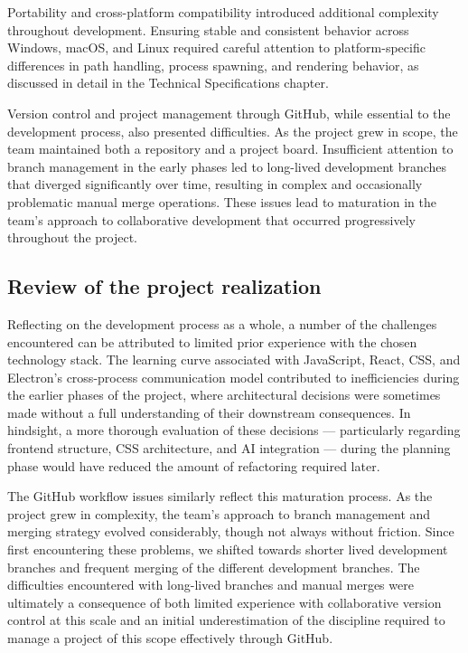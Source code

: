 \documentclass[a4paper,12pt]{article}
\begin{document}
Portability and cross-platform compatibility introduced additional complexity throughout development. 
Ensuring stable and consistent behavior across Windows, macOS, and Linux required careful attention to platform-specific differences in path handling, process spawning, and rendering behavior, as discussed in detail in the Technical Specifications chapter.

Version control and project management through GitHub, while essential to the development process, also presented difficulties. 
As the project grew in scope, the team maintained both a repository and a project board. 
Insufficient attention to branch management in the early phases led to long-lived development branches that diverged significantly over time, resulting in complex and occasionally problematic manual merge operations. 
These issues lead to maturation in the team's approach to collaborative development that occurred progressively throughout the project.

\newpage
\subsection{Review of the project realization}
Reflecting on the development process as a whole, a number of the challenges encountered can be attributed to limited prior experience with the chosen technology stack. The learning curve associated with JavaScript, React, CSS, and Electron's cross-process communication model contributed to inefficiencies during the earlier phases of the project, where architectural decisions were sometimes made without a full understanding of their downstream consequences. In hindsight, a more thorough evaluation of these decisions — particularly regarding frontend structure, CSS architecture, and AI integration — during the planning phase would have reduced the amount of refactoring required later.

The GitHub workflow issues similarly reflect this maturation process. 
As the project grew in complexity, the team's approach to branch management and merging strategy evolved considerably, though not always without friction. 
Since first encountering these problems, we shifted towards shorter lived development branches and frequent merging of the different development branches. 
The difficulties encountered with long-lived branches and manual merges were ultimately a consequence of both limited experience with collaborative version control at this scale and an initial underestimation of the discipline required to manage a project of this scope effectively through GitHub.
\end{document}
